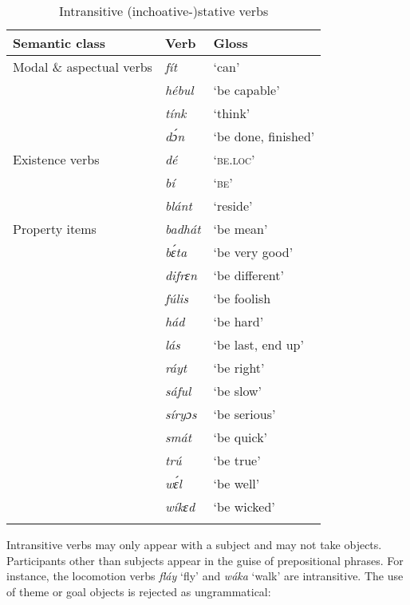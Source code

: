 \begin{table}
\caption{Intransitive (inchoative-)stative verbs}
\label{tab:key:9.4}

\begin{tabularx}{\textwidth}{lXX}
\lsptoprule
Semantic class & Verb & Gloss\\
\midrule 
Modal \& aspectual verbs & \itshape fít & ‘can’\\
& \itshape hébul & ‘be capable’\\
& \itshape tínk & ‘think’\\
& \itshape dɔ́n & ‘be done, finished’\\

\tablevspace
Existence verbs & \itshape dé & \textsc{‘be.loc’}\\
& \itshape bí & \textsc{‘be’}\\
& \itshape blánt & ‘reside’\\

\tablevspace
Property items & \itshape badhát & ‘be mean’\\
& \itshape bɛ́ta & ‘be very good’\\
& \itshape difrɛn & ‘be different’\\
& \itshape fúlis & ‘be foolish\\
& \itshape hád & ‘be hard’\\
& \itshape lás & ‘be last, end up’\\
& \itshape ráyt & ‘be right’\\
& \itshape sáful & ‘be slow’\\
& \itshape síryɔs & ‘be serious’\\
& \itshape smát & ‘be quick’\\
& \itshape trú & ‘be true’\\
& \itshape wɛ́l & ‘be well’\\
& \itshape wíkɛd & ‘be wicked’\\
\lspbottomrule
\end{tabularx}
\end{table}
Intransitive verbs may only appear with a subject and may not take objects. Participants other than subjects appear in the guise of prepositional phrases. For instance, the locomotion verbs \textit{fláy} ‘fly’ and \textit{wáka} ‘walk’ are intransitive. The use of theme  or goal objects  is rejected as ungrammatical:


